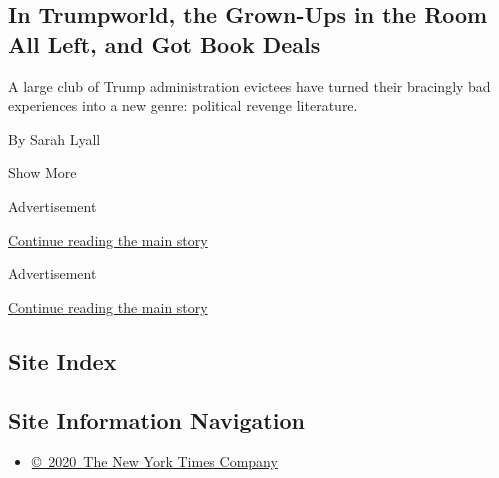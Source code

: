 \begin{enumerate}
  \hypertarget{in-trumpworld-the-grown-ups-in-the-room-all-left-and-got-book-deals}{%
  \subsection{In Trumpworld, the Grown-Ups in the Room All Left, and Got
  Book
  Deals}\label{in-trumpworld-the-grown-ups-in-the-room-all-left-and-got-book-deals}}

  A large club of Trump administration evictees have turned their
  bracingly bad experiences into a new genre: political revenge
  literature.

  By Sarah Lyall
\end{enumerate}

Show More

Advertisement

\protect\hyperlink{after-mid2}{Continue reading the main story}

Advertisement

\protect\hyperlink{after-mktg}{Continue reading the main story}

\hypertarget{site-index}{%
\subsection{Site Index}\label{site-index}}

\hypertarget{site-information-navigation}{%
\subsection{Site Information
Navigation}\label{site-information-navigation}}

\begin{itemize}
\tightlist
\item
  \href{https://help.nytimes.com/hc/en-us/articles/115014792127-Copyright-notice}{©~2020~The
  New York Times Company}
\end{itemize}

